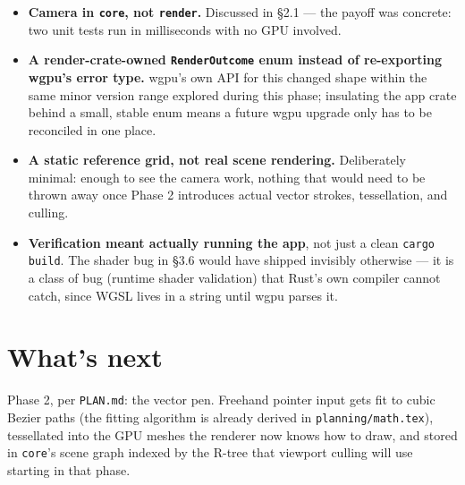 \documentclass[11pt]{article}
\begin{document}
\begin{itemize}
  \item \textbf{Camera in \texttt{core}, not \texttt{render}.} Discussed in \S2.1 — the
    payoff was concrete: two unit tests run in milliseconds with no GPU involved.
  \item \textbf{A render-crate-owned \texttt{RenderOutcome} enum instead of re-exporting
    wgpu's error type.} wgpu's own API for this changed shape within the same minor
    version range explored during this phase; insulating the app crate behind a small,
    stable enum means a future wgpu upgrade only has to be reconciled in one place.
  \item \textbf{A static reference grid, not real scene rendering.} Deliberately minimal:
    enough to see the camera work, nothing that would need to be thrown away once Phase 2
    introduces actual vector strokes, tessellation, and culling.
  \item \textbf{Verification meant actually running the app}, not just a clean
    \texttt{cargo build}. The shader bug in \S3.6 would have shipped invisibly otherwise —
    it is a class of bug (runtime shader validation) that Rust's own compiler cannot catch,
    since WGSL lives in a string until wgpu parses it.
\end{itemize}

\section{What's next}
Phase 2, per \texttt{PLAN.md}: the vector pen. Freehand pointer input gets fit to cubic
Bezier paths (the fitting algorithm is already derived in \texttt{planning/math.tex}),
tessellated into the GPU meshes the renderer now knows how to draw, and stored in
\texttt{core}'s scene graph indexed by the R-tree that viewport culling will use starting
in that phase.
\end{document}
